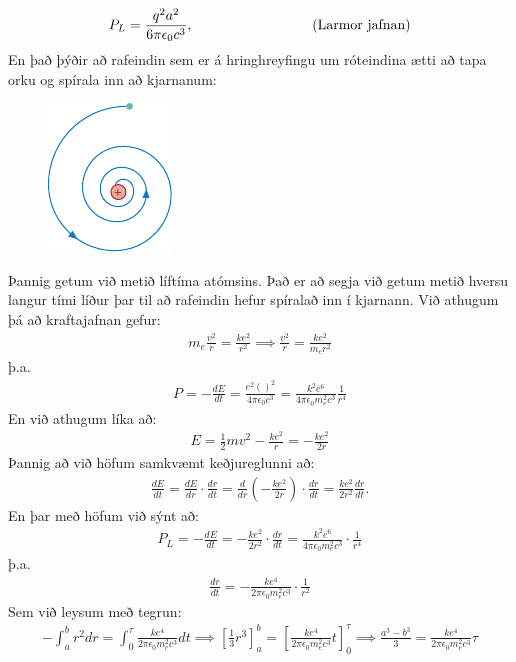 \begin{align*}
    P_L = \frac{q^2a^2}{6\pi \epsilon_0 c^3}, \hspace*{3cm} \text{(Larmor jafnan)}
\end{align*}
En það þýðir að rafeindin sem er á hringhreyfingu um róteindina ætti að tapa orku og spírala inn að kjarnanum:
\begin{figure}[H]
    \centering
    \includegraphics{figures/spirala.pdf}
\end{figure}
Þannig getum við metið líftíma atómsins. Það er að segja við getum metið hversu langur tími líður þar til að rafeindin hefur spíralað inn í kjarnann. Við athugum þá að kraftajafnan gefur:
\begin{align*}
    m_e \frac{v^2}{r} = \frac{ke^2}{r^2} \implies \frac{v^2}{r} = \frac{ke^2}{m_er^2}
\end{align*}
þ.a.
\begin{align*}
    P = - \frac{dE}{dt} = \frac{e^2 \left( \right)^2}{4\pi \epsilon_0 c^3} = \frac{k^2 e^6}{4\pi \epsilon_0 m_e^2 c^3} \frac{1}{r^4}
\end{align*}
En við athugum líka að:
\begin{align*}
    E = \frac{1}{2}mv^2 - \frac{ke^2}{r} = -\frac{ke^2}{2r}
\end{align*}
Þannig að við höfum samkvæmt keðjureglunni að:
\begin{align*}
    \frac{dE}{dt} = \frac{dE}{dr} \cdot \frac{dr}{dt} = \frac{d}{dr}\left( -\frac{ke^2}{2r} \right) \cdot \frac{dr}{dt} = \frac{ke^2}{2r^2} \frac{dr}{dt}.
\end{align*}
En þar með höfum við sýnt að:
\begin{align*}
    P_L = -\frac{dE}{dt} = -\frac{ke^2}{2r^2}\cdot \frac{dr}{dt} = \frac{k^2e^6}{4\pi \epsilon_0 m_e^2 c^3} \cdot \frac{1}{r^4}
\end{align*}
þ.a.
\begin{align*}
    \frac{dr}{dt} = -\frac{ke^4}{2\pi \epsilon_0 m_e^2 c^3} \cdot \frac{1}{r^2}
\end{align*}
Sem við leysum með tegrun:
\begin{align*}
    -\int_{a}^{b} r^2 dr = \int_{0}^{\tau} \frac{ke^4}{2\pi \epsilon_0 m_e^2 c^3}dt \implies \left[ \frac{1}{3}r^3 \right]_{a}^{b} = \left[ \frac{ke^4}{2\pi \epsilon_0 m_e^2 c^3} t  \right]_{0}^{\tau} \implies \frac{a^3-b^3}{3} = \frac{ke^4}{2\pi \epsilon_0 m_e^2 c^3} \tau
\end{align*}
